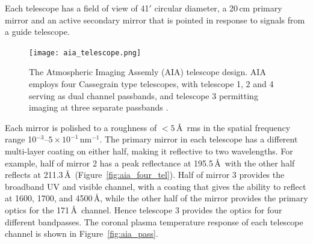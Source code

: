 Each telescope has a field of view of 41$'$ circular diameter, a 20\,cm primary mirror and an active secondary mirror that is pointed in response to signals from a guide telescope. 
\begin{figure}[!t]
\begin{center}
\texttt{[image: aia\_telescope.png]}
\caption[The AIA telescope design]{The Atmospheric Imaging Assemly (AIA) telescope design. AIA employs four Cassegrain type telescopes, with telescope 1, 2 and 4 serving as dual channel passbands, and telescope 3 permitting imaging at three separate passbands \citep{lemen2012}.}
\label{fig:aia_cass}
\end{center}
\end{figure}
Each mirror is polished to a roughness of $<5$\,\AA~rms in the spatial frequency range 10$^{-3}$--$5\times10^{-1}$\,nm$^{-1}$. {\color{blue}The primary mirror in each telescope has a different multi-layer coating on either half, making it reflective to two wavelengths. For example, half of mirror 2 has a peak reflectance at 195.5\,\AA~with the other half reflects at 211.3\,\AA~(Figure~\ref{fig:aia_four_tel}).} Half of mirror 3 provides the broadband UV and visible channel, with a coating that gives the ability to reflect at 1600, 1700, and 4500\,\AA, while the other half of the mirror provides the primary optics for the 171\,\AA~channel. Hence telescope 3 provides the optics for four different bandpasses. The coronal plasma temperature response of each telescope channel is shown in Figure~\ref{fig:aia_pass}.

